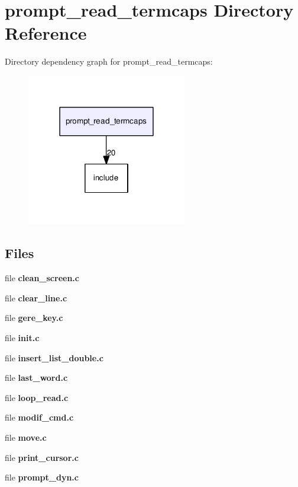 \section{prompt\-\_\-read\-\_\-termcaps Directory Reference}
\label{dir_88aafd85f93f518a0b9c13001f488cc0}
Directory dependency graph for prompt\-\_\-read\-\_\-termcaps\-:
\nopagebreak
\begin{figure}[H]
\begin{center}
\leavevmode
\includegraphics[width=198pt]{dir_88aafd85f93f518a0b9c13001f488cc0_dep}
\end{center}
\end{figure}
\subsection*{Files}
\begin{DoxyCompactItemize}
\item 
file {\bf clean\-\_\-screen.\-c}
\item 
file {\bf clear\-\_\-line.\-c}
\item 
file {\bf gere\-\_\-key.\-c}
\item 
file {\bf init.\-c}
\item 
file {\bf insert\-\_\-list\-\_\-double.\-c}
\item 
file {\bf last\-\_\-word.\-c}
\item 
file {\bf loop\-\_\-read.\-c}
\item 
file {\bf modif\-\_\-cmd.\-c}
\item 
file {\bf move.\-c}
\item 
file {\bf print\-\_\-cursor.\-c}
\item 
file {\bf prompt\-\_\-dyn.\-c}
\end{DoxyCompactItemize}
